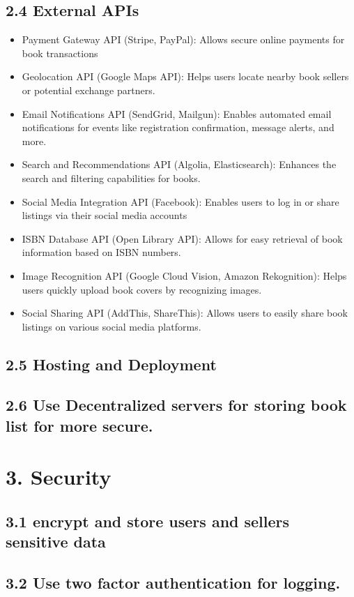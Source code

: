\documentclass[english,10pt,a4paper]{article}
\begin{document}
		\subsection*{2.4 External APIs}
			\begin{itemize}
				\item Payment Gateway API (Stripe, PayPal): Allows secure online payments for book transactions
				\item Geolocation API (Google Maps API): Helps users locate nearby book sellers or potential exchange partners.
				\item Email Notifications API (SendGrid, Mailgun): Enables automated email notifications for events like registration confirmation, message alerts, and more.
				\item Search and Recommendations API (Algolia, Elasticsearch): Enhances the search and filtering capabilities for books.
				\item Social Media Integration API (Facebook): Enables users to log in or share listings via their social media accounts
				\item ISBN Database API (Open Library API): Allows for easy retrieval of book information based on ISBN numbers.
				\item Image Recognition API (Google Cloud Vision, Amazon Rekognition): Helps users quickly upload book covers by recognizing images.
				\item Social Sharing API (AddThis, ShareThis): Allows users to easily share book listings on various social media platforms.
			\end{itemize}
		\subsection*{2.5 Hosting and Deployment}
		\subsection*{2.6 Use Decentralized servers for storing book list for more secure.}
		
	\section*{3. Security}
		\subsection*{3.1 encrypt and store users and sellers sensitive  data}
		\subsection*{3.2 Use two factor authentication for logging.}
			
		
			
			
		
		
			
	
\end{document}
